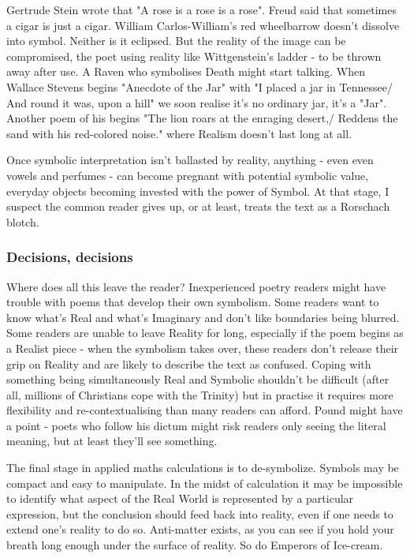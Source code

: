 \documentclass[11pt]{article}
\begin{document}
Gertrude Stein wrote that "A rose is a rose is a rose". Freud said that sometimes a cigar is just a cigar. William Carlos-William's red wheelbarrow doesn't dissolve into symbol. Neither is it eclipsed. But the reality of the image can be compromised, the poet using reality like Wittgenstein's ladder - to be thrown away after use. A Raven who symbolises Death might start talking. When Wallace Stevens begins "Anecdote of the Jar" with "I placed a jar in Tennessee/ And round it was, upon a hill" we soon realise it's no ordinary jar, it's a "Jar". Another poem of his begins "The lion roars at the enraging desert,/ Reddens the sand with his red-colored noise." where Realism doesn't last long at all.

Once symbolic interpretation isn't ballasted by reality, anything - even even vowels and perfumes - can become pregnant with potential symbolic value, everyday objects becoming invested with the power of Symbol. At that stage, I suspect the common reader gives up, or at least, treats the text as a Rorschach blotch.

\subsubsection*{Decisions, decisions}

Where does all this leave the reader? Inexperienced poetry readers might have trouble with poems that develop their own symbolism. Some readers want to know what's Real and what's Imaginary and don't like boundaries being blurred. Some readers are unable to leave Reality for long, especially if the poem begins as a Realist piece - when the symbolism takes over, these readers don't release their grip on Reality and are likely to describe the text as confused. Coping with something being simultaneously Real and Symbolic shouldn't be difficult (after all, millions of Christians cope with the Trinity) but in practise it requires more flexibility and re-contextualising than many readers can afford. Pound might have a point - poets who follow his dictum might risk readers only seeing the literal meaning, but at least they'll see something.

The final stage in applied maths calculations is to de-symbolize. Symbols may be compact and easy to manipulate. In the midst of calculation it may be impossible to identify what aspect of the Real World is represented by a particular expression, but the conclusion should feed back into reality, even if one needs to extend one's reality to do so. Anti-matter exists, as you can see if you hold your breath long enough under the surface of reality. So do Emperors of Ice-cream.
\end{document}
